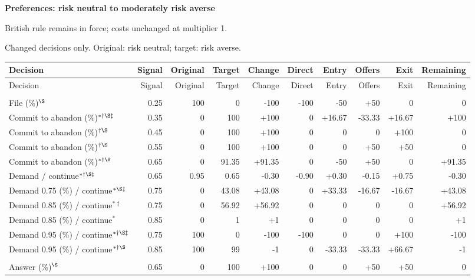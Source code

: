 \documentclass[10pt]{article}
\begin{document}
{\large\bfseries Preferences: risk neutral to moderately risk averse}\par
British rule remains in force; costs unchanged at multiplier 1.\par
{\small Changed decisions only. Original: risk neutral; target: risk averse.}\par
{\small\setlength{\tabcolsep}{3pt}\begin{longtable}{@{}>{\raggedright\arraybackslash}p{1.65in}rrrrrrrrr@{}}
\toprule Decision & Signal & Original & Target & Change & Direct & Entry & Offers & Exit & Remaining \\\midrule\endfirsthead
\toprule Decision & Signal & Original & Target & Change & Direct & Entry & Offers & Exit & Remaining \\\midrule\endhead
\bottomrule\endfoot
\multicolumn{10}{@{}l}{\textbf{Plaintiff}}\\
File (\%)$^{\S}$ & 0.25 & 100 & 0 & -100 & -100 & -50 & +50 & 0 & 0\\
Commit to abandon (\%)$^{*\dagger\S\ddagger}$ & 0.35 & 0 & 100 & +100 & 0 & +16.67 & -33.33 & +16.67 & +100\\
Commit to abandon (\%)$^{\dagger\S}$ & 0.45 & 0 & 100 & +100 & 0 & 0 & 0 & +100 & 0\\
Commit to abandon (\%)$^{\dagger\S}$ & 0.55 & 0 & 100 & +100 & 0 & 0 & +50 & +50 & 0\\
Commit to abandon (\%)$^{*\dagger\S}$ & 0.65 & 0 & 91.35 & +91.35 & 0 & -50 & +50 & 0 & +91.35\\
Demand / continue$^{*\dagger\S\ddagger}$ & 0.65 & 0.95 & 0.65 & -0.30 & -0.90 & +0.30 & -0.15 & +0.75 & -0.30\\
Demand 0.75 (\%) / continue$^{*\S\ddagger}$ & 0.75 & 0 & 43.08 & +43.08 & 0 & +33.33 & -16.67 & -16.67 & +43.08\\
Demand 0.85 (\%) / continue$^{*\ddagger}$ & 0.75 & 0 & 56.92 & +56.92 & 0 & 0 & 0 & 0 & +56.92\\
Demand 0.85 (\%) / continue$^{*}$ & 0.85 & 0 & 1 & +1 & 0 & 0 & 0 & 0 & +1\\
Demand 0.95 (\%) / continue$^{*\dagger\S\ddagger}$ & 0.75 & 100 & 0 & -100 & -100 & 0 & 0 & +100 & -100\\
Demand 0.95 (\%) / continue$^{*\dagger\S}$ & 0.85 & 100 & 99 & -1 & 0 & -33.33 & -33.33 & +66.67 & -1\\
\multicolumn{10}{@{}l}{\textbf{Defendant}}\\
Answer (\%)$^{\S}$ & 0.65 & 0 & 100 & +100 & 0 & 0 & +50 & +50 & 0\\

\end{longtable}}
\end{document}
